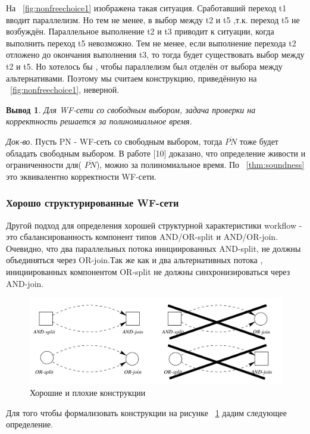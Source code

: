 \documentclass[a4paper,12pt]{article}
\newtheorem{corollary}{Вывод}
\begin{document}
На ~\cref{fig:nonfreechoice1} изображена такая ситуация. Сработавший переход t1 вводит параллелизм. Но тем не менее, в выбор между t2 и t5 ,т.к. переход t5 не возбуждён. Параллельное выполнение t2 и t3 приводит к ситуации, когда выполнить переход t5 невозможно. Тем не менее, если выполнение перехода t2 отложено до окончания выполнения t3, то тогда будет существовать выбор между t2 и t5. Но хотелось бы , чтобы параллелизм был отделён от выбора между альтернативами. Поэтому мы считаем конструкцию, приведённую на ~\cref{fig:nonfreechoice1}, неверной.



\begin{corollary}\label{crl:freechoicesoundness}
Для WF-сети со свободным выбором, задача проверки на корректность решается за полиномиальное время. 
\end{corollary}
\textit{Док-во.} Пусть PN - WF-сеть со свободным выбором, тогда $\overline{PN}$ тоже будет обладать  свободным выбором.  В работе [10] доказано, что определение живости и ограниченности для( $\overline{PN}$), можно за полиномиальное время. По ~\cref{thm:soundness} это эквивалентно корректности WF-сети.


\subsubsection{Хорошо структурированные WF-сети}
Другой подход для определения хорошей структурной характеристики workflow - это сбалансированность  компонент типов AND/OR-split и AND/OR-join. Очевидно, что два параллельных потока инициированных AND-split, не должны объединяться через OR-join.Так же как и два альтернативных потока ,  инициированных компонентом OR-split не должны синхронизироваться через AND-join.
\begin{figure}[here]
    \centering
    \includegraphics[width=\textwidth]{bad_joins.png}
    \caption{Хорошие и плохие конструкции}
    \label{img:bad_joins}
\end{figure}

Для того чтобы формализовать конструкции на рисунке ~\cref{img:bad_joins} дадим следующее определение.
\end{document}
